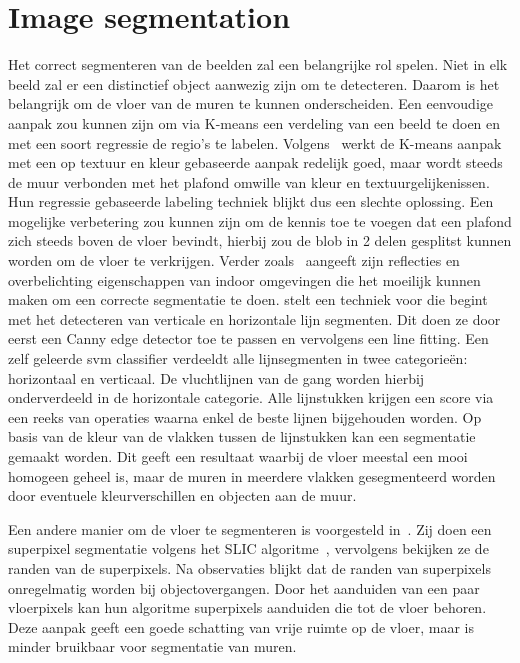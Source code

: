     \section{Image segmentation}\label{sec:image_segmentation}
        Het correct segmenteren van de beelden zal een belangrijke rol spelen. Niet in elk beeld zal er een distinctief object aanwezig zijn om te detecteren. Daarom is het belangrijk om de vloer van
        de muren te kunnen onderscheiden. Een eenvoudige aanpak zou kunnen zijn om via K-means een verdeling van een beeld te doen en met een soort regressie de regio's te labelen. 
        Volgens~\cite{zhangwall} werkt de K-means aanpak met een op textuur en kleur gebaseerde aanpak redelijk goed, maar wordt steeds de muur verbonden met het plafond omwille van kleur en textuurgelijkenissen.
        Hun regressie gebaseerde labeling techniek blijkt dus een slechte oplossing.
        Een mogelijke verbetering zou kunnen zijn om de kennis toe te voegen dat een plafond zich steeds boven de vloer bevindt, hierbij zou de blob in 2 delen gesplitst kunnen worden om de vloer te verkrijgen.
        Verder zoals~\cite{Li2010} aangeeft zijn reflecties en overbelichting eigenschappen van indoor omgevingen die het moeilijk kunnen maken om
        een correcte segmentatie te doen.
        \cite{Li2010} stelt een techniek voor die begint met het detecteren van verticale en horizontale lijn segmenten. Dit doen ze door eerst een Canny edge detector\cite{Canny} toe te passen en vervolgens een line fitting.
        Een zelf geleerde \gls{svm} classifier verdeeldt alle lijnsegmenten in twee categorie\"{e}n: horizontaal en verticaal. De vluchtlijnen van de gang worden hierbij onderverdeeld in de horizontale categorie.
        Alle lijnstukken krijgen een score via een reeks van operaties waarna enkel de beste lijnen bijgehouden worden. Op basis van de kleur van de vlakken tussen de lijnstukken kan een segmentatie gemaakt worden.
        Dit geeft een resultaat waarbij de vloer meestal een mooi homogeen geheel is, maar de muren in meerdere vlakken gesegmenteerd worden door eventuele kleurverschillen en objecten aan de muur.
        
        Een andere manier om de vloer te segmenteren is voorgesteld in~\cite{Rodriguez-Telles2013}. Zij doen een superpixel segmentatie volgens het SLIC algoritme~\cite{slic}, vervolgens bekijken ze de randen van de superpixels.
        Na observaties blijkt dat de randen van superpixels onregelmatig worden bij objectovergangen. Door het aanduiden van een paar vloerpixels kan hun algoritme superpixels aanduiden die tot de vloer behoren.
        Deze aanpak geeft een goede schatting van vrije ruimte op de vloer, maar is minder bruikbaar voor segmentatie van muren.

